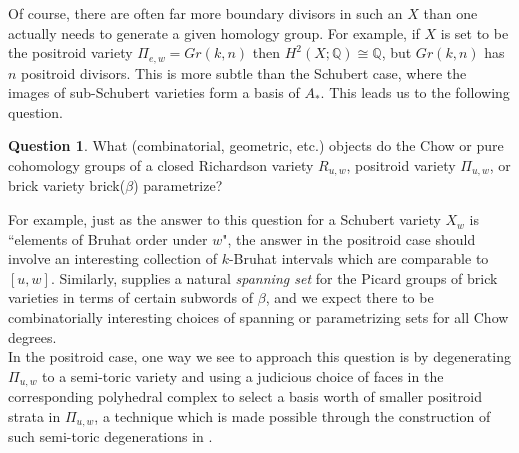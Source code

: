 \documentclass[11pt]{amsart}
\newtheorem{lem}[thm]{Lemma}
\theoremstyle{definition}
\newtheorem{ques}[thm]
{Question}
\theoremstyle{remark}
\numberwithin{equation}{section}
\begin{document}
Of course, there are often far more boundary divisors in such an $X$ than one actually needs to generate a given homology group. For example, if $X$ is set to be the positroid variety $\Pi_{e,w} = Gr(k,n)$ then $H^2(X; \mathbb{Q}) \cong \mathbb{Q}$, but $Gr(k,n)$ has $n$ positroid divisors. This is more subtle than the Schubert case, where the images of sub-Schubert varieties form a basis of $A_*$. This leads us to the following question.

\begin{ques}
    What (combinatorial, geometric, etc.) objects do the Chow or pure cohomology groups of a closed Richardson variety $R_{u,w}$, positroid variety $\Pi_{u,w}$, or brick variety brick($\beta$) parametrize?
\end{ques}

For example, just as the answer to this question for a Schubert variety $X_w$ is ``elements of Bruhat order under $w$", the answer in the positroid case should involve an interesting collection of $k$-Bruhat intervals which are comparable to $[u, w]$. Similarly, \cite{bossinger26braid} supplies a natural \textit{spanning set} for the Picard groups of brick varieties in terms of certain subwords of $\beta$, and we expect there to be combinatorially interesting choices of  spanning or parametrizing sets for all Chow degrees.\\

In the positroid case, one way we see to approach this question is by degenerating $\Pi_{u,w}$ to a semi-toric variety and using a judicious choice of faces in the corresponding polyhedral complex to select a basis worth of smaller positroid strata in $\Pi_{u,w}$, a technique which is made possible through the construction of such semi-toric degenerations in \cite{chang2026fence}.


\end{document}
